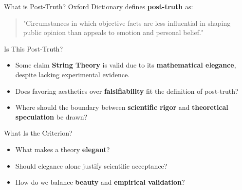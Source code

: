 \begin{frame}{What is Post-Truth?}
	Oxford Dictionary defines \textbf{post-truth} as:

	\begin{quote}
		"Circumstances in which objective facts are less influential
		in shaping public opinion than appeals to emotion and
		personal belief." \cite{Oxford2016}
	\end{quote}
\end{frame}

\begin{frame}{Is This Post-Truth?}
	\begin{itemize}
		\item Some claim \textbf{String Theory} is valid due to its
			\textbf{mathematical elegance}, despite lacking experimental evidence.
		\item Does favoring aesthetics over \textbf{falsifiability}
			fit the definition of post-truth?
		\item Where should the boundary between \textbf{scientific rigor}
			and \textbf{theoretical speculation} be drawn?
	\end{itemize}
\end{frame}

\begin{frame}{What Is the Criterion?}
	\begin{itemize}
		\item What makes a theory \textbf{elegant}?
		\item Should elegance alone justify scientific acceptance?
		\item How do we balance \textbf{beauty} and \textbf{empirical validation}?
	\end{itemize}
\end{frame}

